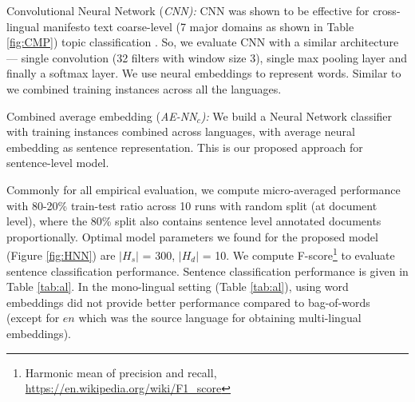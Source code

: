 \documentclass[11pt,a4paper]{article}
\newcommand{\norm}[1]{\vert #1 \vert}
\begin{document}
\begin{description}
\item{Convolutional Neural Network (\em{CNN}):} CNN was shown to be effective for cross-lingual manifesto text coarse-level (7 major domains as shown in Table \ref{fig:CMP}) topic classification \cite{W17-2906}. So, we evaluate CNN with a similar architecture --- single convolution (32 filters with window size 3), single max pooling layer and finally a softmax layer. We use neural embeddings to represent words. Similar to \cite{W17-2906} we combined training instances across all the languages.
\item{Combined average embedding (\em{AE-NN$_{c}$}):} We build a Neural Network classifier with training instances combined across languages, with average neural embedding as sentence representation. This is our proposed approach for sentence-level model.
\end{description}

Commonly for all empirical evaluation, we compute micro-averaged performance with 80-20\% train-test ratio across 10 runs with random split (at document level), where the 80\% split also contains sentence level annotated documents proportionally. Optimal model parameters we found for the proposed model (Figure \ref{fig:HNN}) are $\norm{H_{s}}$ = 300, $\norm{H_{d}}$ = 10. We compute F-score\footnote{Harmonic mean of precision and recall, \url{https://en.wikipedia.org/wiki/F1_score}} to evaluate sentence classification performance. Sentence classification performance is given in Table \ref{tab:al}. In the mono-lingual setting (Table \ref{tab:al}), using word embeddings did not provide better performance compared to bag-of-words (except for $en$ which was the source language for obtaining multi-lingual embeddings). 
\end{document}
